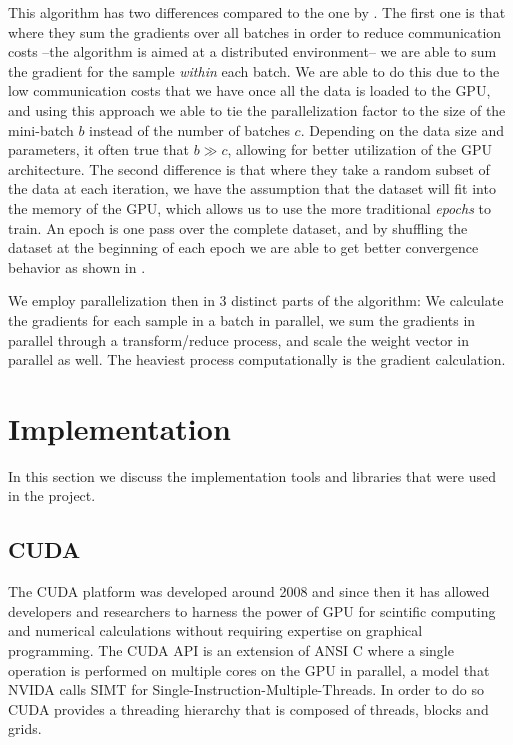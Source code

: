 \documentclass[11pt,a4paper]{article}
\begin{document}
This algorithm has two differences compared to the one by \cite{dekel2012optimal}.
The first one is that where
they sum the gradients over all batches in order to reduce communication costs --the algorithm is
aimed at a distributed environment-- we are able to sum the gradient for the sample \textit{within}
each batch. We are able to do this due to the low communication costs that we have once all the
data is loaded to the GPU, and using this approach we able to tie the parallelization factor to the
size of the mini-batch $b$ instead of the number of batches $c$. Depending on the data size and
parameters, it often true that $b \gg c$, allowing for better utilization of the GPU
architecture.
The second difference is that where they take a random subset of the data at each iteration,
we have the assumption that the dataset will fit into the memory of the GPU, which allows us
to use the more traditional \textit{epochs} to train. An epoch is one pass over the complete
dataset, and by shuffling the dataset at the beginning of each epoch we are able to get better
convergence behavior as shown in \cite{bottou2010large}.

We employ parallelization then in 3 distinct parts of the algorithm: We calculate the gradients for
each sample in a batch in parallel, we sum the gradients in parallel through a transform/reduce
process, and scale the weight vector in parallel as well. The heaviest process computationally is
the gradient calculation.


\section{Implementation}
In this section we discuss the implementation tools and libraries that were used in the project.

\subsection{CUDA}
The CUDA platform was developed around 2008 \citep{nickolls2008scalable} and since then it has
allowed developers and researchers to harness the power of GPU for scintific computing
and numerical calculations without requiring expertise on graphical programming. The CUDA API is an extension of
ANSI C where a single operation is performed on multiple cores on the GPU in parallel, a model
that NVIDA calls SIMT for Single-Instruction-Multiple-Threads. In order to do so
CUDA provides a threading hierarchy that is composed of threads, blocks and grids.
\end{document}
